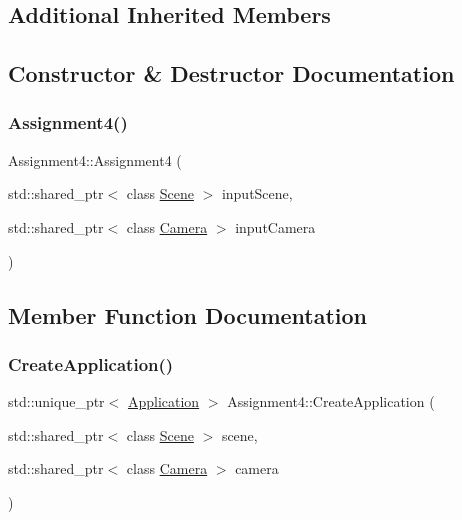 \subsection*{Additional Inherited Members}


\subsection{Constructor \& Destructor Documentation}
\hypertarget{class_assignment4_a318b02cf93165113069f3b44a8d13589}{}\label{class_assignment4_a318b02cf93165113069f3b44a8d13589} 
\subsubsection{\texorpdfstring{Assignment4()}{Assignment4()}}
{\footnotesize\ttfamily Assignment4\+::\+Assignment4 (\begin{DoxyParamCaption}\item[{std\+::shared\+\_\+ptr$<$ class \hyperlink{class_scene}{Scene} $>$}]{input\+Scene,  }\item[{std\+::shared\+\_\+ptr$<$ class \hyperlink{class_camera}{Camera} $>$}]{input\+Camera }\end{DoxyParamCaption})}



\subsection{Member Function Documentation}
\hypertarget{class_assignment4_a7a2d272e1ce394cd4e7b66e840c2c806}{}\label{class_assignment4_a7a2d272e1ce394cd4e7b66e840c2c806} 
\subsubsection{\texorpdfstring{Create\+Application()}{CreateApplication()}}
{\footnotesize\ttfamily std\+::unique\+\_\+ptr$<$ \hyperlink{class_application}{Application} $>$ Assignment4\+::\+Create\+Application (\begin{DoxyParamCaption}\item[{std\+::shared\+\_\+ptr$<$ class \hyperlink{class_scene}{Scene} $>$}]{scene,  }\item[{std\+::shared\+\_\+ptr$<$ class \hyperlink{class_camera}{Camera} $>$}]{camera }\end{DoxyParamCaption})\hspace{0.3cm}{\ttfamily [static]}}

